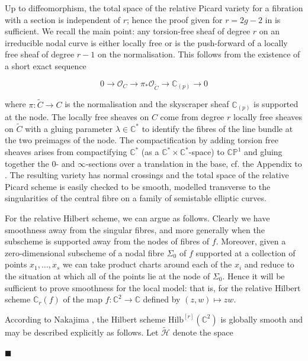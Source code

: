 \documentclass[10pt]{article}
\newcommand{\pp}{\mathbb{P}}
\newcommand{\cc}{\mathbb{C}}
\newcommand{\Hilb}{\mathrm{Hilb}}
\newenvironment{Pf}{\par \noindent{\sc Proof:} }{\quad $\blacksquare$ \par
\vspace{0.5cm}}
\begin{document}
\begin{Pf}
Up to diffeomorphism, the total space of the relative Picard variety
for a fibration with a section is independent of $r$; 
hence the proof given for $r=2g-2$ in \cite{SKDIS} is sufficient.
We recall the main point: any torsion-free sheaf of degree $r$ on an
irreducible 
nodal curve is either locally free or is the push-forward of a locally
free sheaf of degree $r-1$ on the normalisation.  This follows from
the existence of a short exact sequence 

$$0 \rightarrow \mathcal{O}_C \rightarrow \pi_*
\mathcal{O}_{\tilde{C}} \rightarrow \cc_{(p)} \rightarrow 0$$

\noindent where $\pi: \tilde{C} \rightarrow C$ is the normalisation
and the skyscraper sheaf $\cc_{(p)}$ is supported at the node.  The
locally free sheaves on $C$ come from degree $r$ locally free sheaves
on $\tilde{C}$ with a gluing parameter $\lambda \in \cc^*$ to identify
the fibres of the line bundle at the two preimages of the node.  The
compactification by adding torsion free sheaves arises from
compactifying $\cc^*$ (as a $\cc^* \times \cc^*$-space) to $\cc \pp^1$ and
gluing together the $0$- and $\infty$-sections over a translation in
the base, cf. the Appendix to \cite{SKDIS}.  The resulting variety has
normal crossings and the total space of the relative Picard scheme is
easily checked to be smooth, modelled transverse to the singularities
of the central fibre on a family of semistable elliptic curves. 

\vspace{0.2cm}

\noindent  For the relative Hilbert scheme, we can argue as follows.
Clearly we 
have smoothness away from the singular fibres, and more generally when
the subscheme is supported away from the nodes of fibres of $f$.
Moreover, given a
zero-dimensional subscheme of a nodal fibre $\Sigma_0$ of $f$
supported at a collection of points $x_1, \ldots, x_s$ we can take
product charts around each of the $x_i$ and reduce to the situation at
which all of the points lie at the node of $\Sigma_0$.  Hence it will
be sufficient to prove smoothness for the local model: that is, for
the relative Hilbert scheme $\cc_r(f)$ of the map $f: \cc^2
\rightarrow \cc$ defined by $(z,w) \mapsto zw$.

\vspace{0.2cm}

\noindent According to Nakajima \cite{Nakajima}, the Hilbert scheme
$\Hilb^{[r]}(\cc^2)$ is globally smooth and may be described
explicitly as follows.  Let $\tilde{\mathcal{H}}$ denote the space


\end{Pf}
\end{document}
